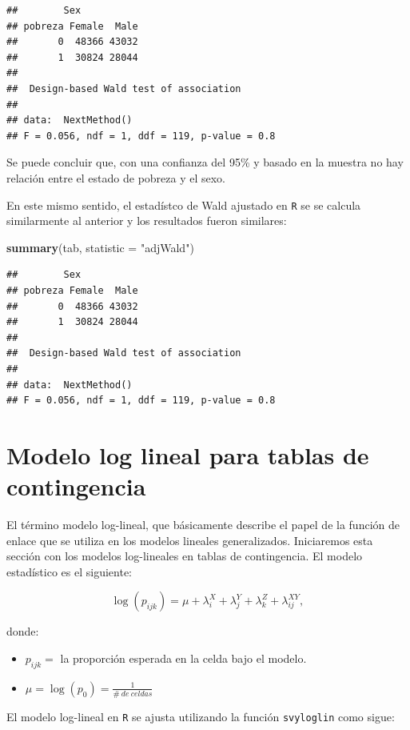 \documentclass[
  spanish,
  12pt,
]{book}
\newenvironment{Shaded}{\begin{snugshade}}{\end{snugshade}}
\newcommand{\AttributeTok}[1]{\textcolor[rgb]{0.13,0.29,0.53}{#1}}
\newcommand{\FunctionTok}[1]{\textcolor[rgb]{0.13,0.29,0.53}{\textbf{#1}}}
\newcommand{\NormalTok}[1]{#1}
\newcommand{\StringTok}[1]{\textcolor[rgb]{0.31,0.60,0.02}{#1}}
\begin{document}
\begin{verbatim}
##        Sex
## pobreza Female  Male
##       0  48366 43032
##       1  30824 28044
## 
##  Design-based Wald test of association
## 
## data:  NextMethod()
## F = 0.056, ndf = 1, ddf = 119, p-value = 0.8
\end{verbatim}

Se puede concluir que, con una confianza del 95\% y basado en la muestra no hay relación entre el estado de pobreza y el sexo.

En este mismo sentido, el estadístco de Wald ajustado en \texttt{R} se se calcula similarmente al anterior y los resultados fueron similares:

\begin{Shaded}
\begin{Highlighting}[]
\FunctionTok{summary}\NormalTok{(tab, }\AttributeTok{statistic =} \StringTok{"adjWald"}\NormalTok{)}
\end{Highlighting}
\end{Shaded}

\begin{verbatim}
##        Sex
## pobreza Female  Male
##       0  48366 43032
##       1  30824 28044
## 
##  Design-based Wald test of association
## 
## data:  NextMethod()
## F = 0.056, ndf = 1, ddf = 119, p-value = 0.8
\end{verbatim}

\section{Modelo log lineal para tablas de contingencia}\label{modelo-log-lineal-para-tablas-de-contingencia}

El término modelo log-lineal, que básicamente describe el papel de la función de enlace que se utiliza en los modelos lineales generalizados. Iniciaremos esta sección con los modelos log-lineales en tablas de contingencia. El modelo estadístico es el siguiente:

\[
  \log(p_{ijk}) = \mu + \lambda_i^X + \lambda_j^Y + \lambda_k^Z + \lambda_{ij}^{XY}  ,   
\]

donde:

\begin{itemize}
\item
  \(p_{ijk}=\) la proporción esperada en la celda bajo el modelo.
\item
  \(\mu = \log(p_{0})=\frac{1}{\#\ de\ celdas}\)
\end{itemize}

El modelo log-lineal en \texttt{R} se ajusta utilizando la función \texttt{svyloglin} como sigue:
\end{document}
